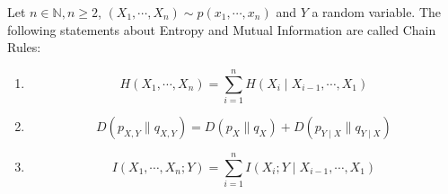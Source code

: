\begin{theorem} \label{theorem:chain-rules}
    Let $n \in \mathbb{N}, n \ge 2$, $(X_1, \cdots, X_n) \sim p(x_1, \cdots, x_n)$ and $Y$ a random variable.
    The following statements about Entropy and Mutual Information are called Chain Rules:
    \begin{enumerate}
        \item \label{item:chain-rules-entropy}
            \[
                H(X_1, \cdots, X_n) = \sum_{i=1}^{n}{H(X_i \mid X_{i-1}, \cdots, X_1)}
            \]
        \item
            \[
                D(p_{X,Y} \| q_{X,Y}) = D(p_X \| q_X) + D(p_{Y \mid X} \| q_{Y \mid X})
            \]
        \item
            \[
                I(X_1, \cdots, X_n; Y) = \sum_{i=1}^{n}{I(X_i; Y \mid X_{i-1}, \cdots, X_1)}
            \]
    \end{enumerate}
\end{theorem}
